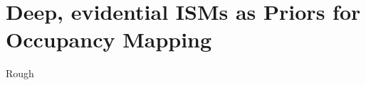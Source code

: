 \chapter{Deep, evidential ISMs as Priors for Occupancy Mapping}
\label{ch:deep_ev_isms_as_prior_for_occmaps}

Rough 


